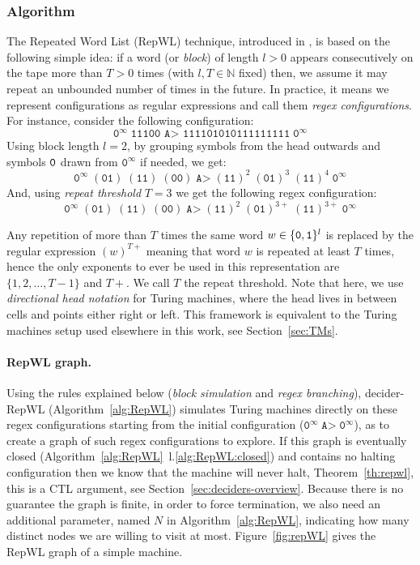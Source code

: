\subsubsection{Algorithm}

The Repeated Word List (RepWL) technique, introduced in \CoqBB, is based on the following simple idea: if a word (or \textit{block}) of length $l > 0$ appears consecutively on the tape more than $T > 0$ times (with $l, T \in \mathbb{N}$ fixed) then, we assume it may repeat an unbounded number of times in the future. In practice, it means we represent configurations as regular expressions and call them \textit{regex configurations}. For instance, consider the following configuration:
$$ \texttt{0}^\infty \; \texttt{11100 A> 111101010111111111} \; \texttt{0}^\infty$$
Using block length $l=2$, by grouping symbols from the head outwards and symbols $\texttt{0}$ drawn from $\texttt{0}^\infty$ if needed, we get:
$$ \texttt{0}^\infty \; (\texttt{01}) \; (\texttt{11}) \; (\texttt{00}) \; \texttt{A>} \; (\texttt{11})^2 \; (\texttt{01})^{3} \; (\texttt{11})^{4} \; \texttt{0}^\infty $$
And, using \textit{repeat threshold} $T=3$ we get the following regex configuration:
$$ \texttt{0}^\infty \; (\texttt{01}) \; (\texttt{11}) \; (\texttt{00}) \; \texttt{A>} \; (\texttt{11})^2 \; (\texttt{01})^{3+} \; (\texttt{11})^{3+} \; \texttt{0}^\infty $$

Any repetition of more than $T$ times the same word $w \in \{\texttt{0},\texttt{1}\}^l$ is replaced by the regular expression $(w)^{T+}$ meaning that word $w$ is repeated at least $T$ times, hence the only exponents to ever be used in this representation are $\{1,2,\dots,T-1\}$ and $T+$. We call $T$ the repeat threshold. Note that here, we use \textit{directional head notation} for Turing machines, where the head lives in between cells and points either right or left. This framework is equivalent to the Turing machines setup used elsewhere in this work, see Section~\ref{sec:TMs}.

\paragraph{RepWL graph.} Using the rules explained below (\textit{block simulation} and \textit{regex branching}), {\sc decider-RepWL} (Algorithm~\ref{alg:RepWL}) simulates Turing machines directly on these regex configurations starting from the initial configuration (\ie $\texttt{0}^\infty \; \texttt{A>} \; \texttt{0}^\infty$), as to create a graph of such regex configurations to explore. If this graph is eventually closed (Algorithm~\ref{alg:RepWL}~l.\ref{alg:RepWL:closed}) and contains no halting configuration then we know that the machine will never halt, Theorem~\ref{th:repwl}, this is a CTL argument, see Section~\ref{sec:deciders-overview}. Because there is no guarantee the graph is finite, in order to force termination, we also need an additional parameter, named $N$ in Algorithm~\ref{alg:RepWL}, indicating how many distinct nodes we are willing to visit at most. Figure~\ref{fig:repWL} gives the RepWL graph of a simple machine.

